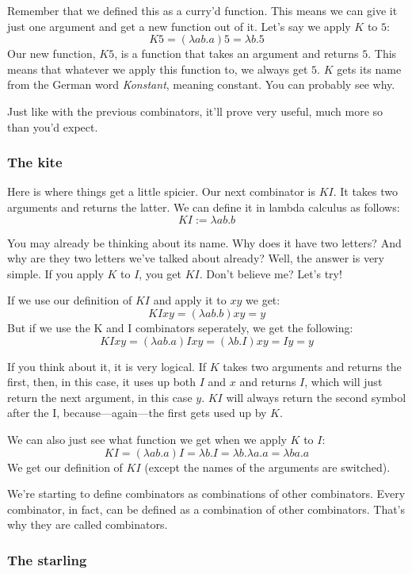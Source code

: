 \documentclass[11pt]{article}
\begin{document}
Remember that we defined this as a curry'd function. This means we can give it
just one argument and get a new function out of it. Let's say we apply \(K\) to
\(5\):
\[K5=(\lambda ab.a)5=\lambda b.5\]
Our new function, \(K5\), is a function that takes an argument and returns
\(5\). This means that whatever we apply this function to, we always get \(5\).
\(K\) gets its name from the German word \emph{Konstant}, meaning constant. You
can probably see why.

Just like with the previous combinators, it'll prove very useful, much more so
than you'd expect.

\subsubsection{The kite}

Here is where things get a little spicier. Our next combinator is \(KI\). It
takes two arguments and returns the latter. We can define it in lambda calculus
as follows:
\[KI:=\lambda ab.b\]

You may already be thinking about its name. Why does it have two letters? And
why are they two letters we've talked about already? Well, the answer is very
simple. If you apply \(K\) to \(I\), you get \(KI\). Don't believe me? Let's
try!

If we use our definition of \(KI\) and apply it to \(xy\) we get:
\[KIxy=(\lambda ab.b)xy=y\]
But if we use the K and I combinators seperately, we get the following:
\[KIxy=(\lambda ab.a)Ixy=(\lambda b.I)xy=Iy=y\]

If you think about it, it is very logical. If \(K\) takes two arguments and
returns the first, then, in this case, it uses up both \(I\) and \(x\) and
returns \(I\), which will just return the next argument, in this case \(y\).
\(KI\) will always return the second symbol after the I, because---again---the
first gets used up by \(K\).

We can also just see what function we get when we apply \(K\) to \(I\):
\[KI=(\lambda ab.a)I=\lambda b.I=\lambda b.\lambda a.a=\lambda ba.a\] We get
our definition of \(KI\) (except the names of the arguments are switched).

We're starting to define combinators as combinations of other combinators.
Every combinator, in fact, can be defined as a combination of other
combinators. That's why they are called combinators.

\subsubsection{The starling}
\end{document}
